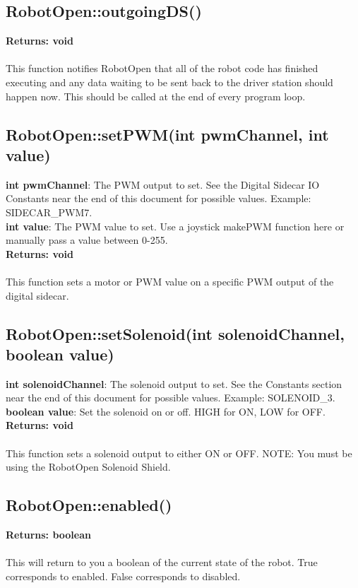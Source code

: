 \documentclass[11pt]{article} %
\begin{document}
\subsection{RobotOpen::outgoingDS()}
\textbf{Returns: void}\\\\
This function notifies RobotOpen that all of the robot code has finished executing and any data waiting to be sent back to the driver station should happen now. This should be called at the end of every program loop.
\subsection{RobotOpen::setPWM(int pwmChannel, int value)}
\textbf{int pwmChannel}: The PWM output to set. See the Digital Sidecar IO Constants near the end of this document for possible values. Example: SIDECAR\_PWM7.\\
\textbf{int value}: The PWM value to set. Use a joystick makePWM function here or manually pass a value between 0-255.\\
\textbf{Returns: void}\\\\
This function sets a motor or PWM value on a specific PWM output of the digital sidecar.
\subsection{RobotOpen::setSolenoid(int solenoidChannel, boolean value)}
\textbf{int solenoidChannel}: The solenoid output to set. See the Constants section near the end of this document for possible values. Example: SOLENOID\_3.\\
\textbf{boolean value}: Set the solenoid on or off. HIGH for ON, LOW for OFF.\\
\textbf{Returns: void}\\\\
This function sets a solenoid output to either ON or OFF. NOTE: You must be using the RobotOpen Solenoid Shield.
\subsection{RobotOpen::enabled()}
\textbf{Returns: boolean}\\\\
This will return to you a boolean of the current state of the robot. True corresponds to enabled. False corresponds to disabled.
\end{document}
